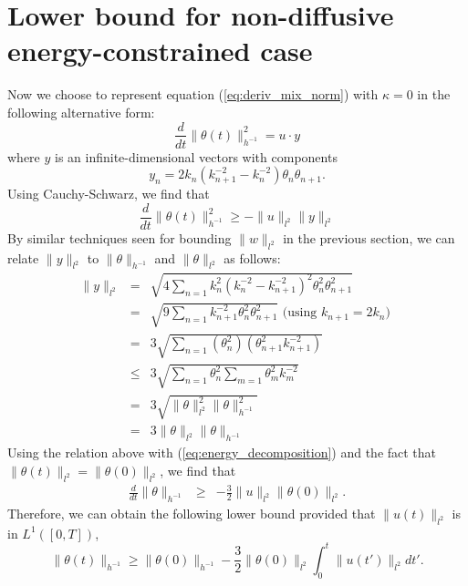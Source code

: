 \section{Lower bound for non-diffusive energy-constrained case}
\label{appendix:bound_energy_no_diff}
Now we choose to represent equation (\ref{eq:deriv_mix_norm}) with $\kappa = 0$ in the following alternative form:
\begin{equation}
	\label{eq:energy_decomposition}
	\frac{d}{dt} \| \theta (t) \|^{2}_{h^{-1}} =u\cdot y
\end{equation}
where $y$ is an infinite-dimensional vectors with components \[y_{n}= 2k_{n}\left(k_{n+1}^{-2}-k_{n}^{-2}\right)\theta_{n}\theta_{n+1}.\] Using Cauchy-Schwarz, we find that
\begin{equation}
	\frac{d}{dt} \| \theta (t) \|^{2}_{h^{-1}} \geq - \|u\|_{l^{2}}\| y\|_{l^{2}}
\end{equation}
By similar techniques seen for bounding $\|w\|_{l^{2}}$ in the previous section, we can  relate $\|y\|_{l^{2}}$ to $\|\theta\|_{h^{-1}}$  and $\|\theta\|_{l^{2}}$ as follows:
\begin{eqnarray}
	\|y\|_{l^{2}} &=& \sqrt{4\sum_{n=1}k^{2}_{n} (k^{-2}_{n}-k^{-2}_{n+1} )^{2}\theta_{n}^{2}\theta_{n+1}^{2}}\\
	&= & \sqrt{ 9\sum_{n=1} k^{-2}_{n+1} \theta_{n}^{2}\theta_{n+1}^{2}}   \text{ (using $k_{n+1}=2 k_{n}$) }\\
	& = & 3\sqrt{ \sum_{n=1} ( \theta_{n}^{2}) ( \theta_{n+1}^{2}k_{n+1}^{-2})}  \\
	&\leq  & 3\sqrt{ \sum_{n=1}  \theta_{n}^{2} \sum_{m=1} \theta_{m}^{2}k_{m}^{-2}} \\
	&= & 3\sqrt{\|\theta\|_{l^{2}}^2\|\theta\|_{h^{-1}}^2} \\
	&= & 3\|\theta\|_{l^{2}}\|\theta\|_{h^{-1}}
\end{eqnarray}
Using the relation above with (\ref{eq:energy_decomposition}) and the fact that $\|\theta(t)\|_{l^{2}}=\|\theta(0)\|_{l^{2}}$, we find that
\begin{eqnarray}
	\frac{d}{dt} \| \theta \|_{h^{-1}}& \geq & - \frac{3}{2}\|u\|_{l^{2}}\| \theta(0)\|_{l^{2}}.
\end{eqnarray}
Therefore, we can obtain the following lower bound provided that  $\|u(t)\|_{l^{2}}$ is in $L^{1}([0,T])$,
\begin{equation}
	\label{eq:bound_energy_no_diff}
	\|\theta (t) \|_{h^{-1}} \geq\|\theta (0) \|_{h^{-1}} -\frac{3}{2}\|\theta(0)\|_{l^{2}}\int_{0}^{t}\|u(t')\|_{l^{2}} dt'.
\end{equation}

